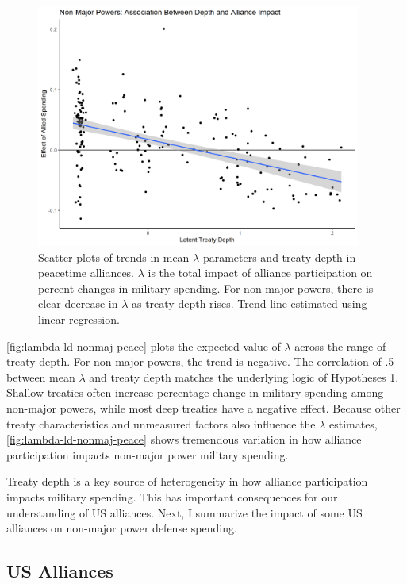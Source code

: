 \documentclass[12pt]{article}
\begin{document}
\begin{figure}[htbp]
	\centering
		\includegraphics[width=0.95\textwidth]{../figures/lambda-ld-nonmaj.png}
	\caption{Scatter plots of trends in mean $\lambda$ parameters and treaty depth in peacetime alliances. $\lambda$ is the total impact of alliance participation on percent changes in military spending. For non-major powers, there is clear decrease in $\lambda$ as treaty depth rises. Trend line estimated using linear regression.}
	\label{fig:lambda-ld-nonmaj-peace}
\end{figure}


\autoref{fig:lambda-ld-nonmaj-peace} plots the expected value of $\lambda$ across the range of treaty depth. 
For non-major powers, the trend is negative.
The correlation of .5 between mean $\lambda$ and treaty depth matches the underlying logic of Hypotheses 1. 
Shallow treaties often increase  percentage change in military spending among non-major powers, while most deep treaties have a negative effect. 
Because other treaty characteristics and unmeasured factors also influence the $\lambda$ estimates, \autoref{fig:lambda-ld-nonmaj-peace} shows tremendous variation in how alliance participation impacts non-major power military spending. 



Treaty depth is a key source of heterogeneity in how alliance participation impacts military spending. 
This has important consequences for our understanding of US alliances. 
Next, I summarize the impact of some US alliances on non-major power defense spending. 


\subsection{US Alliances}
\end{document}
